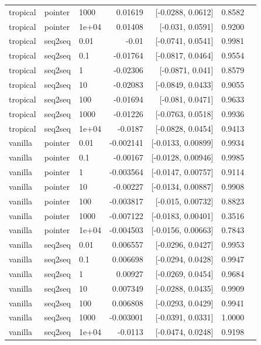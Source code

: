 \documentclass[10pt]{article}
\begin{document}
{\begin{longtable}{lllrrrl}
tropical & pointer & 1000 & 0.01619 & [-0.0288, 0.0612] & 0.8582 & \\
tropical & pointer & 1e+04 & 0.01408 & [-0.031, 0.0591] & 0.9200 & \\
tropical & seq2seq & 0.01 & -0.01 & [-0.0741, 0.0541] & 0.9981 & \\
tropical & seq2seq & 0.1 & -0.01764 & [-0.0817, 0.0464] & 0.9554 & \\
tropical & seq2seq & 1 & -0.02306 & [-0.0871, 0.041] & 0.8579 & \\
tropical & seq2seq & 10 & -0.02083 & [-0.0849, 0.0433] & 0.9055 & \\
tropical & seq2seq & 100 & -0.01694 & [-0.081, 0.0471] & 0.9633 & \\
tropical & seq2seq & 1000 & -0.01226 & [-0.0763, 0.0518] & 0.9936 & \\
tropical & seq2seq & 1e+04 & -0.0187 & [-0.0828, 0.0454] & 0.9413 & \\
vanilla & pointer & 0.01 & -0.002141 & [-0.0133, 0.00899] & 0.9934 & \\
vanilla & pointer & 0.1 & -0.00167 & [-0.0128, 0.00946] & 0.9985 & \\
vanilla & pointer & 1 & -0.003564 & [-0.0147, 0.00757] & 0.9114 & \\
vanilla & pointer & 10 & -0.00227 & [-0.0134, 0.00887] & 0.9908 & \\
vanilla & pointer & 100 & -0.003817 & [-0.015, 0.00732] & 0.8823 & \\
vanilla & pointer & 1000 & -0.007122 & [-0.0183, 0.00401] & 0.3516 & \\
vanilla & pointer & 1e+04 & -0.004503 & [-0.0156, 0.00663] & 0.7843 & \\
vanilla & seq2seq & 0.01 & 0.006557 & [-0.0296, 0.0427] & 0.9953 & \\
vanilla & seq2seq & 0.1 & 0.006698 & [-0.0294, 0.0428] & 0.9947 & \\
vanilla & seq2seq & 1 & 0.00927 & [-0.0269, 0.0454] & 0.9684 & \\
vanilla & seq2seq & 10 & 0.007349 & [-0.0288, 0.0435] & 0.9909 & \\
vanilla & seq2seq & 100 & 0.006808 & [-0.0293, 0.0429] & 0.9941 & \\
vanilla & seq2seq & 1000 & -0.003001 & [-0.0391, 0.0331] & 1.0000 & \\
vanilla & seq2seq & 1e+04 & -0.0113 & [-0.0474, 0.0248] & 0.9198 & \\
\bottomrule
\end{longtable}
}
\end{document}
